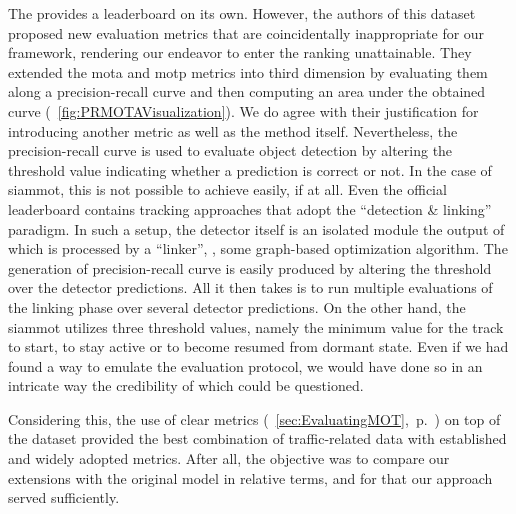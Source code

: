 The \uadetrac{} provides a leaderboard on its own. However, the authors of this dataset proposed new evaluation metrics that are coincidentally inappropriate for our framework, rendering our endeavor to enter the ranking unattainable. They extended the \gls{mota} and \gls{motp} metrics into third dimension by evaluating them along a precision-recall curve and then computing an area under the obtained curve (\figtext{}~\ref{fig:PRMOTAVisualization}). We do agree with their justification for introducing another metric as well as the method itself. Nevertheless, the precision-recall curve is used to evaluate object detection by altering the threshold value indicating whether a prediction is correct or not. In the case of \gls{siammot}, this is not possible to achieve easily, if at all. Even the official \uadetrac{} leaderboard contains tracking approaches that adopt the ``detection \& linking'' paradigm. In such a setup, the detector itself is an isolated module the output of which is processed by a ``linker'', \egtext{}, some graph-based optimization algorithm. The generation of precision-recall curve is easily produced by altering the threshold over the detector predictions. All it then takes is to run multiple evaluations of the linking phase over several detector predictions. On the other hand, the \gls{siammot} utilizes three threshold values, namely the minimum value for the track to start, to stay active or to become resumed from dormant state. Even if we had found a way to emulate the evaluation protocol, we would have done so in an intricate way the credibility of which could be questioned.

Considering this, the use of \gls{clear} metrics (\sectiontext{}~\ref{sec:EvaluatingMOT},~p.~\pageref{sec:EvaluatingMOT}) on top of the \uadetrac{} dataset provided the best combination of traffic-related data with established and widely adopted metrics. After all, the objective was to compare our extensions with the original model in relative terms, and for that our approach served sufficiently.

